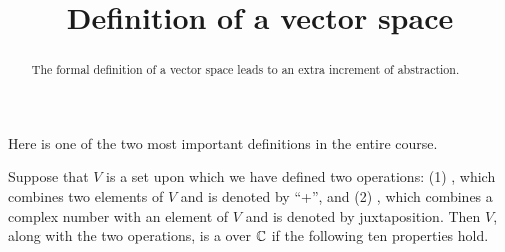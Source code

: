 \documentclass{ximera}
\title{Definition of a vector space}
\begin{document}
\begin{abstract}
The formal definition of a vector space leads to an extra increment of abstraction.
\end{abstract}
\maketitle

Here is one of the two most important definitions in the entire course.

\begin{definition}
  \label{definition:VS}
  Suppose that $V$ is a set upon which we have defined two operations:
  (1) , which combines two elements of $V$ and is
  denoted by ``+'', and (2) , which
  combines a complex number with an element of $V$ and is denoted by
  juxtaposition.  Then $V$, along with the two operations, is a
   over $\mathbb{C}$ if the following ten properties
  hold.


\end{definition}
\end{document}
